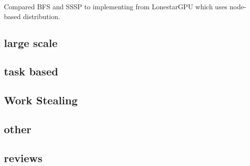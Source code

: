 \documentclass{article}
\begin{document}
Compared BFS and SSSP to implementing from LonestarGPU which uses node-based distribution.


\subsection{large scale}

\cite{PEARCE2017}
\cite{BERLINSKA201814}
\cite{8017633}
\cite{DEVINE2005133}
\cite{javataskpool}
\cite{barat:tel-01672546}



\subsection{task based}

\cite{CPE:CPE1631}
\cite{Bhatti2017}
\cite{5599103}
\cite{Posner2018}
\cite{CCGrid2018}
\cite{8025281}
\cite{7307597}
\cite{Galvez:2017:ATM:3079079.3079104} %


\subsection{Work Stealing}
\cite{Yang2017}
\cite{Chen:2015:LWS:2775085.2766450}
\cite{Blumofe:1999:SMC:324133.324234}
\cite{Cilk}
\cite{Saraswat:2011:LGL:1941553.1941582}

\subsection{other}

\cite{Gao:2017:MPL:3110224.3110240}
\cite{CAMPOS20001213}
\cite{PINAR2004974}
\cite{7551381}
\cite{Menon:2013:DDL:2503210.2503284}
\cite{Liu:2017}
\cite{SEVERIUKHINA2017139}
\cite{7965131}


\subsection{reviews}

\cite{Teresco_2partitioning}

\printbibliography
\end{document}
